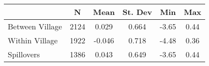 \begin{tabular}{l*{5}{c}}\hline&\multicolumn{1}{c}{N}&\multicolumn{1}{c}{Mean}&\multicolumn{1}{c}{St. Dev}&\multicolumn{1}{c}{Min}&\multicolumn{1}{c}{Max}\\ \hline 
Between Village & 2124 & 0.029 & 0.664 & -3.65 & 0.44 \\
Within Village & 1922 & -0.046 & 0.718 & -4.48 & 0.36 \\
Spillovers & 1386 & 0.043 & 0.649 & -3.65 & 0.44 \\
\hline \end{tabular}
